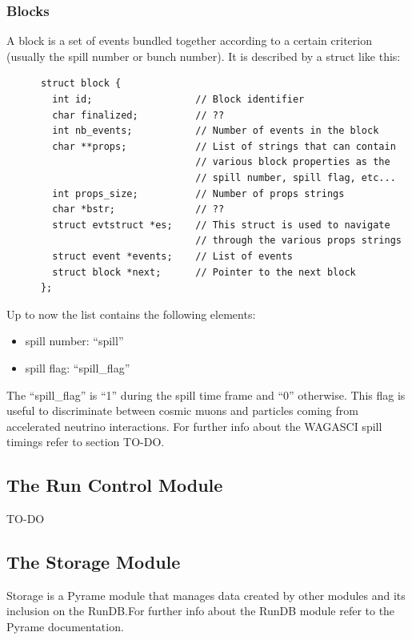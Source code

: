 \subsubsection{Blocks}
A block is a set of events bundled together according to a certain
criterion (usually the spill number or bunch number). It is described
by a struct like this:
\begin{lstlisting}
      struct block {
        int id;                  // Block identifier
        char finalized;          // ??
        int nb_events;           // Number of events in the block
        char **props;            // List of strings that can contain
                                 // various block properties as the
                                 // spill number, spill flag, etc...
        int props_size;          // Number of props strings
        char *bstr;              // ??
        struct evtstruct *es;    // This struct is used to navigate
                                 // through the various props strings
        struct event *events;    // List of events
        struct block *next;      // Pointer to the next block
      };
\end{lstlisting}
Up to now the  list contains the following elements:
\begin{itemize}
\item spill number: ``spill''
\item spill flag: ``spill\_flag''
\end{itemize}

The ``spill\_flag'' is ``1'' during the spill time frame and ``0''
otherwise. This flag is useful to discriminate between cosmic muons
and particles coming from accelerated neutrino interactions.  For
further info about the WAGASCI spill timings refer to section TO-DO.\@

\subsection{The Run Control Module}\label{sec:RC}

TO-DO

\subsection{The Storage Module}\label{sec:STORAGE}

Storage is a Pyrame module that manages data created by other modules
and its inclusion on the RunDB.\@ For further info about the RunDB
module refer to the Pyrame documentation.

